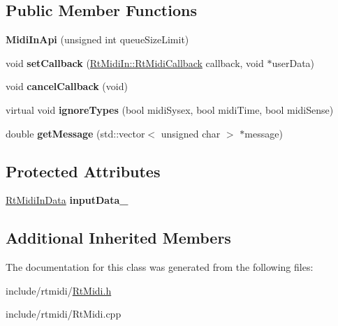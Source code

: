 \subsection*{Public Member Functions}
\begin{DoxyCompactItemize}
\item 
{\bfseries Midi\+In\+Api} (unsigned int queue\+Size\+Limit)\hypertarget{class_midi_in_api_a13593cf0d8561969a1699246781d419f}{}\label{class_midi_in_api_a13593cf0d8561969a1699246781d419f}

\item 
void {\bfseries set\+Callback} (\hyperlink{class_rt_midi_in_aac5c0da1ec6f97fe43d5189bad00caef}{Rt\+Midi\+In\+::\+Rt\+Midi\+Callback} callback, void $\ast$user\+Data)\hypertarget{class_midi_in_api_a1282553fc782963bab50c8e928912d3a}{}\label{class_midi_in_api_a1282553fc782963bab50c8e928912d3a}

\item 
void {\bfseries cancel\+Callback} (void)\hypertarget{class_midi_in_api_ac6d15bd172db9d766c80f84a71c96f87}{}\label{class_midi_in_api_ac6d15bd172db9d766c80f84a71c96f87}

\item 
virtual void {\bfseries ignore\+Types} (bool midi\+Sysex, bool midi\+Time, bool midi\+Sense)\hypertarget{class_midi_in_api_ae2c7698c6c62fe95aef53ddba98cab89}{}\label{class_midi_in_api_ae2c7698c6c62fe95aef53ddba98cab89}

\item 
double {\bfseries get\+Message} (std\+::vector$<$ unsigned char $>$ $\ast$message)\hypertarget{class_midi_in_api_a191f9da986b41b96efb432585367583a}{}\label{class_midi_in_api_a191f9da986b41b96efb432585367583a}

\end{DoxyCompactItemize}
\subsection*{Protected Attributes}
\begin{DoxyCompactItemize}
\item 
\hyperlink{struct_midi_in_api_1_1_rt_midi_in_data}{Rt\+Midi\+In\+Data} {\bfseries input\+Data\+\_\+}\hypertarget{class_midi_in_api_a82698013334ea0de690a91d8644def17}{}\label{class_midi_in_api_a82698013334ea0de690a91d8644def17}

\end{DoxyCompactItemize}
\subsection*{Additional Inherited Members}


The documentation for this class was generated from the following files\+:\begin{DoxyCompactItemize}
\item 
include/rtmidi/\hyperlink{_rt_midi_8h}{Rt\+Midi.\+h}\item 
include/rtmidi/Rt\+Midi.\+cpp\end{DoxyCompactItemize}
